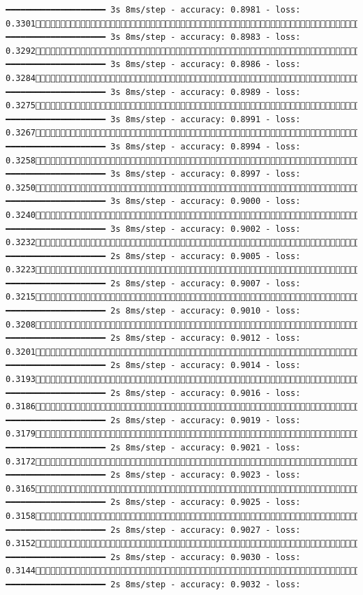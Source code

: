 \documentclass[
  letterpaper,
  DIV=11,
  numbers=noendperiod]{scrreprt}
\begin{document}
\begin{verbatim}
━━━━━━━━━━━━━━━━━━━━ 3s 8ms/step - accuracy: 0.8981 - loss: 0.33011452/1875 ━━━━━━━━━━━━━━━━━━━━ 3s 8ms/step - accuracy: 0.8983 - loss: 0.32921459/1875 ━━━━━━━━━━━━━━━━━━━━ 3s 8ms/step - accuracy: 0.8986 - loss: 0.32841466/1875 ━━━━━━━━━━━━━━━━━━━━ 3s 8ms/step - accuracy: 0.8989 - loss: 0.32751473/1875 ━━━━━━━━━━━━━━━━━━━━ 3s 8ms/step - accuracy: 0.8991 - loss: 0.32671480/1875 ━━━━━━━━━━━━━━━━━━━━ 3s 8ms/step - accuracy: 0.8994 - loss: 0.32581487/1875 ━━━━━━━━━━━━━━━━━━━━ 3s 8ms/step - accuracy: 0.8997 - loss: 0.32501495/1875 ━━━━━━━━━━━━━━━━━━━━ 3s 8ms/step - accuracy: 0.9000 - loss: 0.32401502/1875 ━━━━━━━━━━━━━━━━━━━━ 3s 8ms/step - accuracy: 0.9002 - loss: 0.32321509/1875 ━━━━━━━━━━━━━━━━━━━━ 2s 8ms/step - accuracy: 0.9005 - loss: 0.32231516/1875 ━━━━━━━━━━━━━━━━━━━━ 2s 8ms/step - accuracy: 0.9007 - loss: 0.32151522/1875 ━━━━━━━━━━━━━━━━━━━━ 2s 8ms/step - accuracy: 0.9010 - loss: 0.32081528/1875 ━━━━━━━━━━━━━━━━━━━━ 2s 8ms/step - accuracy: 0.9012 - loss: 0.32011535/1875 ━━━━━━━━━━━━━━━━━━━━ 2s 8ms/step - accuracy: 0.9014 - loss: 0.31931541/1875 ━━━━━━━━━━━━━━━━━━━━ 2s 8ms/step - accuracy: 0.9016 - loss: 0.31861548/1875 ━━━━━━━━━━━━━━━━━━━━ 2s 8ms/step - accuracy: 0.9019 - loss: 0.31791554/1875 ━━━━━━━━━━━━━━━━━━━━ 2s 8ms/step - accuracy: 0.9021 - loss: 0.31721560/1875 ━━━━━━━━━━━━━━━━━━━━ 2s 8ms/step - accuracy: 0.9023 - loss: 0.31651566/1875 ━━━━━━━━━━━━━━━━━━━━ 2s 8ms/step - accuracy: 0.9025 - loss: 0.31581572/1875 ━━━━━━━━━━━━━━━━━━━━ 2s 8ms/step - accuracy: 0.9027 - loss: 0.31521579/1875 ━━━━━━━━━━━━━━━━━━━━ 2s 8ms/step - accuracy: 0.9030 - loss: 0.31441585/1875 ━━━━━━━━━━━━━━━━━━━━ 2s 8ms/step - accuracy: 0.9032 - loss: 
\end{verbatim}
\end{document}
